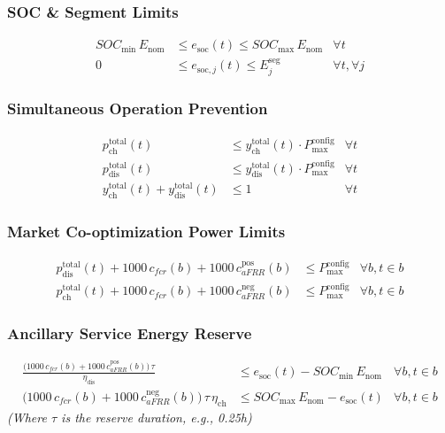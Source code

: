 \documentclass[11pt, a4paper]{article}
\begin{document}
\subsubsection{SOC \& Segment Limits}
\begin{align}
SOC_{\min}\,E_{\mathrm{nom}} &\le e_{\mathrm{soc}}(t) \le SOC_{\max}\,E_{\mathrm{nom}} & \forall t \\
0 &\le e_{\mathrm{soc},j}(t) \le E^{\mathrm{seg}}_{j} & \forall t, \forall j
\end{align}

\subsubsection{Simultaneous Operation Prevention}
\begin{align}
p^{\mathrm{total}}_{\mathrm{ch}}(t) &\le y^{\mathrm{total}}_{\mathrm{ch}}(t) \cdot P^{\mathrm{config}}_{\max} & \forall t \\
p^{\mathrm{total}}_{\mathrm{dis}}(t) &\le y^{\mathrm{total}}_{\mathrm{dis}}(t) \cdot P^{\mathrm{config}}_{\max} & \forall t \\
y^{\mathrm{total}}_{\mathrm{ch}}(t) + y^{\mathrm{total}}_{\mathrm{dis}}(t) &\le 1 & \forall t
\end{align}

\subsubsection{Market Co-optimization Power Limits}
\begin{align}
p^{\mathrm{total}}_{\mathrm{dis}}(t) + 1000\,c_{fcr}(b) + 1000\,c^{\mathrm{pos}}_{aFRR}(b) &\le P^{\mathrm{config}}_{\max} & \forall b, t \in b \\
p^{\mathrm{total}}_{\mathrm{ch}}(t) + 1000\,c_{fcr}(b) + 1000\,c^{\mathrm{neg}}_{aFRR}(b) &\le P^{\mathrm{config}}_{\max} & \forall b, t \in b
\end{align}

\subsubsection{Ancillary Service Energy Reserve}
\begin{align}
    \frac{\big(1000\,c_{fcr}(b) + 1000\,c^{\mathrm{pos}}_{aFRR}(b)\big)\,\tau}{\eta_{\mathrm{dis}}} &\leq e_{\mathrm{soc}}(t) - SOC_{\min}\,E_{\mathrm{nom}} & \forall b, t \in b \\
    \big(1000\,c_{fcr}(b) + 1000\,c^{\mathrm{neg}}_{aFRR}(b)\big)\,\tau\,\eta_{\mathrm{ch}} &\leq SOC_{\max}\,E_{\mathrm{nom}} - e_{\mathrm{soc}}(t) & \forall b, t \in b
\end{align}
\textit{(Where $\tau$ is the reserve duration, e.g., 0.25h)}
\end{document}
